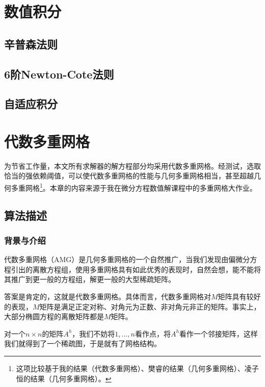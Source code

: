 \documentclass[lang=cn,10pt]{elegantbook}
\begin{document}
\newpage

\chapter{数值积分}

\section{辛普森法则}

\section{6阶Newton-Cote法则}

\section{自适应积分}

\chapter{代数多重网格}

为节省工作量，本文所有求解器的解方程部分均采用代数多重网格。经测试，选取恰当的强依赖阈值，可以使代数多重网格的性能与几何多重网格相当，甚至超越几何多重网格\footnote{这项比较基于我的结果（代数多重网格）、樊睿的结果（几何多重网格）、凌子恒的结果（几何多重网格）。}。本章的内容来源于我在微分方程数值解课程中的多重网格大作业。

\section{算法描述}

\subsection{背景与介绍}

代数多重网格（AMG）是几何多重网格的一个自然推广，当我们发现由偏微分方程引出的离散方程组，使用多重网格具有如此优秀的表现时，自然会想，能不能将其推广到更一般的方程组，解更一般的大型稀疏矩阵。

答案是肯定的，这就是代数多重网格。具体而言，代数多重网格对$M$矩阵具有较好的表现，$M$矩阵是满足正定对称、对角元为正数、非对角元非正的矩阵。事实上，大部分椭圆方程的离散矩阵都是$M$矩阵。

对一个$n\times n$的矩阵$A^h$，我们不妨将$1,...,n$看作点，将$A^h$看作一个邻接矩阵，这样我们就得到了一个稀疏图，于是就有了网格结构。
\end{document}
